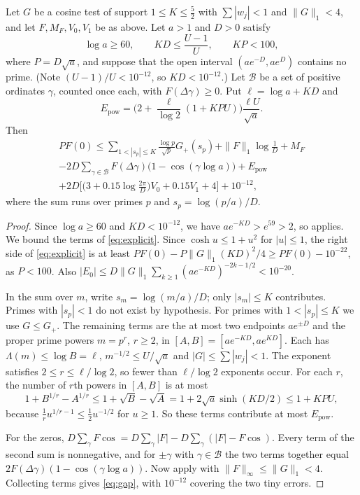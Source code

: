 \documentclass[11pt,colorlinks]{charlie}
\newcommand{\cB}{\mathcal B}
\begin{document}
\begin{proposition}\label{prop:gap}
Let $G$ be a cosine test of support $1\le K\le\frac52$ with $\sum|w_j|<1$ and $\|G\|_1<4$, and let $F,M_F,V_0,V_1$ be as above. Let $a>1$ and $D>0$ satisfy
\begin{equation}\label{eq:H}
 \log a\ge60,\qquad KD\le\frac{U-1}U,\qquad KP<100,
\end{equation}
where $P=D\sqrt a$, and suppose that the open interval $(ae^{-D},ae^{D})$ contains no prime. (Note $(U-1)/U<10^{-12}$, so $KD<10^{-12}$.) Let $\cB$ be a set of positive ordinates $\gamma$, counted once each, with $F(\Delta\gamma)\ge0$. Put $\ell=\log a+KD$ and
\[
 E_{\mathrm{pow}}=\Big(2+\frac{\ell}{\log2}(1+KPU)\Big)\frac{\ell U}{\sqrt a}.
\]
Then
\begin{multline}\label{eq:gap}
 PF(0)\le\sum_{1<|s_p|\le K}\frac{\log p}{\sqrt p}G_+(s_p)+\|F\|_1\log\frac1D+M_F\\
 -2D\sum_{\gamma\in\cB}F(\Delta\gamma)\big(1-\cos(\gamma\log a)\big)+E_{\mathrm{pow}}\\
 +2D\Big[\Big(3+0.15\log\frac{2\pi}D\Big)V_0+0.15V_1+4\Big]+10^{-12},
\end{multline}
where the sum runs over primes $p$ and $s_p=\log(p/a)/D$.
\end{proposition}
\begin{proof}
Since $\log a\ge60$ and $KD<10^{-12}$, we have $ae^{-KD}>e^{59}>2$, so  applies. We bound the terms of \eqref{eq:explicit}. Since $\cosh u\le1+u^2$ for $|u|\le1$, the right side of \eqref{eq:explicit} is at least $PF(0)-P\|G\|_1(KD)^2/4\ge PF(0)-10^{-22}$, as $P<100$. Also $|E_0|\le D\|G\|_1\sum_{k\ge1}(ae^{-KD})^{-2k-1/2}<10^{-20}$.

In the sum over $m$, write $s_m=\log(m/a)/D$; only $|s_m|\le K$ contributes. Primes with $|s_p|<1$ do not exist by hypothesis. For primes with $1<|s_p|\le K$ we use $G\le G_+$. The remaining terms are the at most two endpoints $ae^{\pm D}$ and the proper prime powers $m=p^r$, $r\ge2$, in $[A,B]=[ae^{-KD},ae^{KD}]$. Each has $\Lambda(m)\le\log B=\ell$, $m^{-1/2}\le U/\sqrt a$ and $|G|\le\sum|w_j|<1$. The exponent satisfies $2\le r\le\ell/\log2$, so fewer than $\ell/\log 2$ exponents occur. For each $r$, the number of $r$th powers in $[A,B]$ is at most
\[
 1+B^{1/r}-A^{1/r}\le1+\sqrt B-\sqrt A=1+2\sqrt a\sinh(KD/2)\le1+KPU,
\]
because $\frac1ru^{1/r-1}\le\frac12u^{-1/2}$ for $u\ge1$. So these terms contribute at most $E_{\mathrm{pow}}$.

For the zeros, $D\sum_\gamma F\cos=D\sum_\gamma|F|-D\sum_\gamma(|F|-F\cos)$. Every term of the second sum is nonnegative, and for $\pm\gamma$ with $\gamma\in\cB$ the two terms together equal $2F(\Delta\gamma)(1-\cos(\gamma\log a))$. Now apply  with $\|F\|_\infty\le\|G\|_1<4$. Collecting terms gives \eqref{eq:gap}, with $10^{-12}$ covering the two tiny errors.
\end{proof}
\end{document}
